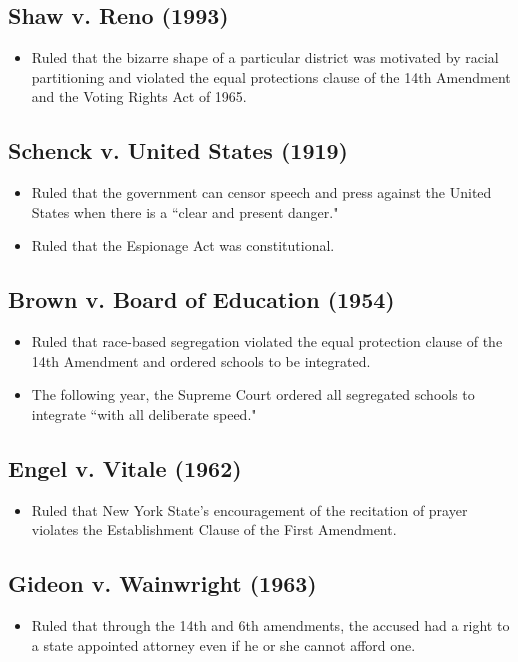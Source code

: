 \documentclass[12pt]{article}
\begin{document}
\hypertarget{Shaw}{\subsection*{Shaw v. Reno (1993)}}
	\begin{itemize}
		\item Ruled that the bizarre shape of a particular district was motivated by racial partitioning and violated the equal protections clause of the 14th Amendment and the Voting Rights Act of 1965.
	\end{itemize}

\hypertarget{Schenck}{\subsection*{Schenck v. United States (1919)}}
	\begin{itemize}
		\item Ruled that the government can censor speech and press against the United States when there is a ``clear and present danger."
		\item Ruled that the Espionage Act was constitutional.
	\end{itemize}

\hypertarget{Brown}{\subsection*{Brown v. Board of Education (1954)}}
	\begin{itemize}
		\item Ruled that race-based segregation violated the equal protection clause of the 14th Amendment and ordered schools to be integrated.
		\item The following year, the Supreme Court ordered all segregated schools to integrate ``with all deliberate speed."
	\end{itemize}

\hypertarget{Engel}{\subsection*{Engel v. Vitale (1962)}}
	\begin{itemize}
		\item Ruled that New York State's encouragement of the recitation of prayer violates the Establishment Clause of the First Amendment.
	\end{itemize}

\hypertarget{Gideon}{\subsection*{Gideon v. Wainwright (1963)}}
	\begin{itemize}
		\item Ruled that through the 14th and 6th amendments, the accused had a right to a state appointed attorney even if he or she cannot afford one.
	\end{itemize}
\end{document}
